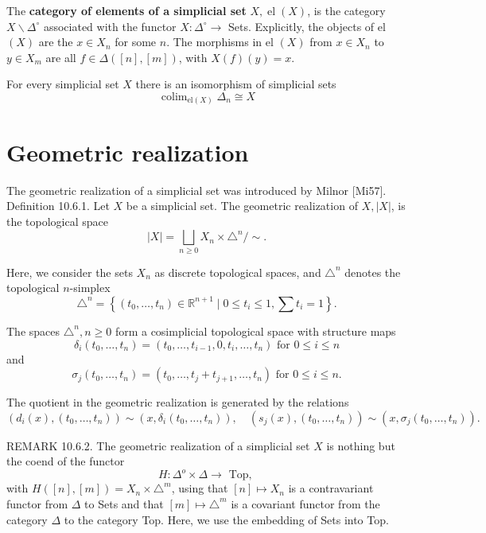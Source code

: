 The \textbf{category of elements of a simplicial set} $X, \operatorname{el}(X)$, is the category $X \backslash \Delta^{\circ}$ associated with the functor $X: \Delta^{\circ} \rightarrow$ Sets. Explicitly, the objects of el $(X)$ are the $x \in X_n$ for some $n$. The morphisms in el $(X)$ from $x \in X_n$ to $y \in X_m$ are all $f \in \Delta([n],[m])$, with $X(f)(y)=x$.

\begin{prop}
For every simplicial set $X$ there is an isomorphism of simplicial sets
$$
\operatorname{colim}_{\mathrm{el}(X)} \Delta_n \cong X
$$
\end{prop}

\section{Geometric realization}

The geometric realization of a simplicial set was introduced by Milnor [Mi57].
Definition 10.6.1. Let $X$ be a simplicial set. The geometric realization of $X,|X|$, is the topological space
$$
|X|=\bigsqcup_{n \geq 0} X_n \times \triangle^n / \sim .
$$

Here, we consider the sets $X_n$ as discrete topological spaces, and $\triangle^n$ denotes the topological $n$-simplex
$$
\triangle^n=\left\{\left(t_0, \ldots, t_n\right) \in \mathbb{R}^{n+1} \mid 0 \leq t_i \leq 1, \sum t_i=1\right\} .
$$

The spaces $\triangle^n, n \geq 0$ form a cosimplicial topological space with structure maps
$$
\delta_i\left(t_0, \ldots, t_n\right)=\left(t_0, \ldots, t_{i-1}, 0, t_i, \ldots, t_n\right) \text { for } 0 \leq i \leq n
$$
and
$$
\sigma_j\left(t_0, \ldots, t_n\right)=\left(t_0, \ldots, t_j+t_{j+1}, \ldots, t_n\right) \text { for } 0 \leq i \leq n .
$$

The quotient in the geometric realization is generated by the relations
$$
\left(d_i(x),\left(t_0, \ldots, t_n\right)\right) \sim\left(x, \delta_i\left(t_0, \ldots, t_n\right)\right), \quad\left(s_j(x),\left(t_0, \ldots, t_n\right)\right) \sim\left(x, \sigma_j\left(t_0, \ldots, t_n\right)\right) .
$$

REMARK 10.6.2. The geometric realization of a simplicial set $X$ is nothing but the coend of the functor
$$
H: \Delta^o \times \Delta \rightarrow \text { Top, }
$$
with $H([n],[m])=X_n \times \triangle^m$, using that $[n] \mapsto X_n$ is a contravariant functor from $\Delta$ to Sets and that $[m] \mapsto \triangle^m$ is a covariant functor from the category $\Delta$ to the category Top. Here, we use the embedding of Sets into Top.

